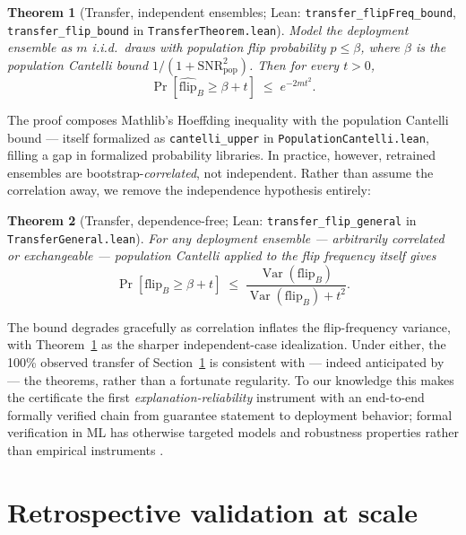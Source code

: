 \documentclass[10pt]{article}
\newtheorem{theorem}{Theorem}
\newcommand{\snr}{\mathrm{SNR}}
\newcommand{\flip}{\mathrm{flip}}
\begin{document}
\begin{theorem}[Transfer, independent ensembles; Lean:
\texttt{transfer\_flipFreq\_bound}, \texttt{transfer\_flip\_bound} in
\texttt{TransferTheorem.lean}]
\label{thm:transfer-iid}
Model the deployment ensemble as $m$ i.i.d.\ draws with population flip probability $p
\le \beta$, where $\beta$ is the population Cantelli bound $1/(1+\snr_{\mathrm{pop}}^2)$.
Then for every $t>0$,
\[
\Pr\!\left[\widehat{\flip}_B \ge \beta + t\right]\;\le\;e^{-2mt^2}.
\]
\end{theorem}

The proof composes Mathlib's Hoeffding inequality with the population Cantelli bound ---
itself formalized as \texttt{cantelli\_upper} in \texttt{PopulationCantelli.lean}, filling
a gap in formalized probability libraries. In practice, however, retrained ensembles are
bootstrap-\emph{correlated}, not independent. Rather than assume the correlation away, we
remove the independence hypothesis entirely:

\begin{theorem}[Transfer, dependence-free; Lean: \texttt{transfer\_flip\_general} in
\texttt{TransferGeneral.lean}]
\label{thm:transfer-general}
For \emph{any} deployment ensemble --- arbitrarily correlated or exchangeable ---
population Cantelli applied to the flip frequency itself gives
\[
\Pr\!\left[\flip_B \ge \beta + t\right]\;\le\;
\frac{\operatorname{Var}(\flip_B)}{\operatorname{Var}(\flip_B) + t^2}.
\]
\end{theorem}

The bound degrades gracefully as correlation inflates the flip-frequency variance, with
Theorem~\ref{thm:transfer-iid} as the sharper independent-case idealization. Under
either, the 100\% observed transfer of Section~\ref{sec:validation} is consistent with
--- indeed anticipated by --- the theorems, rather than a fortunate regularity. To our
knowledge this makes the certificate the first \emph{explanation-reliability} instrument
with an end-to-end formally verified chain from guarantee statement to deployment
behavior; formal verification in ML has otherwise targeted models and robustness
properties rather than empirical instruments
\citep{decker2024provably,noguer2025mathematical}.

\section{Retrospective validation at scale}
\label{sec:validation}
\end{document}

